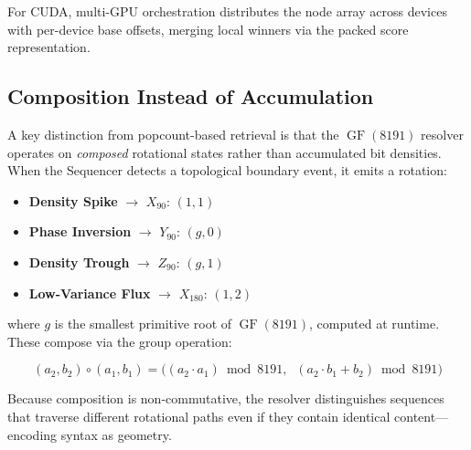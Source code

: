 For CUDA, multi-GPU orchestration distributes the node array across devices
with per-device base offsets, merging local winners via the packed score
representation.

\subsection{Composition Instead of Accumulation}
\label{sec:composition}

A key distinction from popcount-based retrieval is that the
$\operatorname{GF}(8191)$ resolver operates on \emph{composed} rotational
states rather than accumulated bit densities.  When the Sequencer detects
a topological boundary event, it emits a rotation:

\begin{itemize}[nosep]
  \item \textbf{Density Spike} $\to$ $X_{90}$: $(1, 1)$
  \item \textbf{Phase Inversion} $\to$ $Y_{90}$: $(g, 0)$
  \item \textbf{Density Trough} $\to$ $Z_{90}$: $(g, 1)$
  \item \textbf{Low-Variance Flux} $\to$ $X_{180}$: $(1, 2)$
\end{itemize}

\noindent where $g$ is the smallest primitive root of $\operatorname{GF}(8191)$,
computed at runtime.  These compose via the group operation:

\begin{equation}
  (a_2, b_2) \circ (a_1, b_1) = \bigl((a_2 \cdot a_1) \bmod 8191,\;\;
                                        (a_2 \cdot b_1 + b_2) \bmod 8191\bigr)
  \label{eq:composition}
\end{equation}

Because composition is non-commutative, the resolver distinguishes sequences
that traverse different rotational paths even if they contain identical
content---encoding syntax as geometry.

